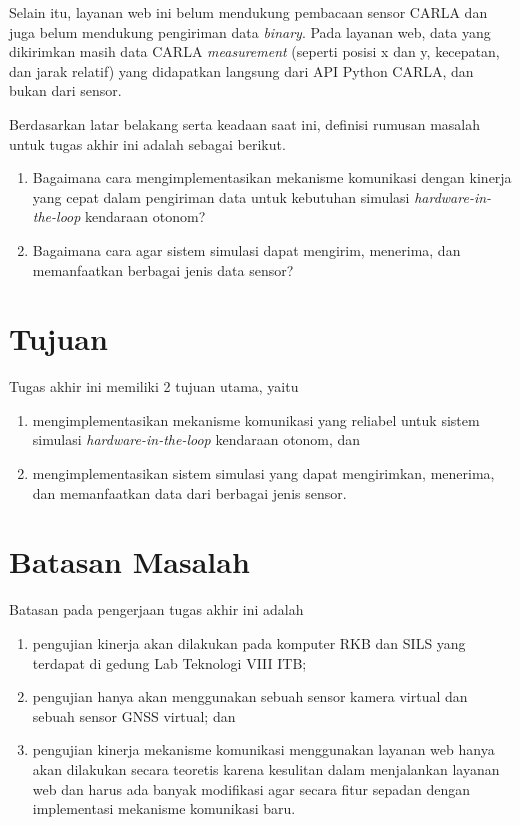 Selain itu, layanan web ini belum mendukung pembacaan sensor CARLA dan juga
belum mendukung pengiriman data \textit{binary}. Pada layanan web, data yang
dikirimkan masih data CARLA \textit{measurement} (seperti posisi x dan y,
kecepatan, dan jarak relatif) yang didapatkan langsung dari API Python CARLA,
dan bukan dari sensor.

Berdasarkan latar belakang serta keadaan saat ini, definisi rumusan masalah
untuk tugas akhir ini adalah sebagai berikut.
\begin{enumerate}
	\item Bagaimana cara mengimplementasikan mekanisme komunikasi dengan kinerja
		yang cepat dalam pengiriman data untuk kebutuhan simulasi
		\textit{hardware-in-the-loop} kendaraan otonom?
	\item Bagaimana cara agar sistem simulasi dapat mengirim, menerima, dan
		memanfaatkan berbagai jenis data sensor?
\end{enumerate}

\section{Tujuan}

Tugas akhir ini memiliki 2 tujuan utama, yaitu
\begin{enumerate}
	\item mengimplementasikan mekanisme komunikasi yang reliabel untuk sistem
		simulasi \textit{hardware-in-the-loop} kendaraan otonom, dan
	\item mengimplementasikan sistem simulasi yang dapat mengirimkan, 
		menerima, dan memanfaatkan data dari berbagai jenis sensor.
\end{enumerate}

\section{Batasan Masalah}

Batasan pada pengerjaan tugas akhir ini adalah

\begin{enumerate}
	\item pengujian kinerja akan dilakukan pada komputer RKB dan SILS yang
		terdapat di gedung Lab Tek\-no\-lo\-gi VIII ITB;
	\item pengujian hanya akan menggunakan sebuah sensor kamera virtual dan
		sebuah sensor GNSS virtual; dan
	\item pengujian kinerja mekanisme komunikasi menggunakan layanan web hanya akan
		dilakukan secara teoretis karena kesulitan dalam menjalankan layanan web
		dan harus ada banyak modifikasi agar secara fitur sepadan dengan
		implementasi mekanisme komunikasi baru.
\end{enumerate}

